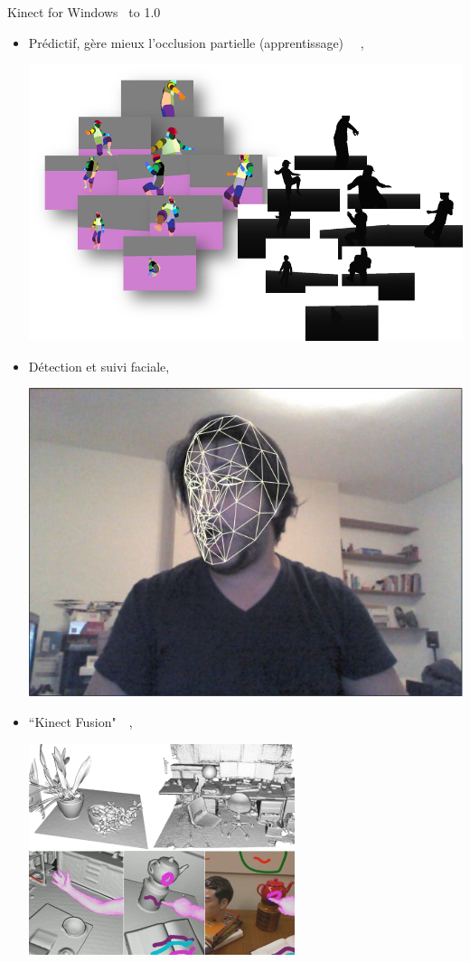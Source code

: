 \begin{frame}{Kinect for Windows~\cite{microsoft_vs_openni_2}}
\vbox to 1.0\textheight
{
\begin{itemize}
  \item<1-> Prédictif, gère mieux l'occlusion partielle (apprentissage)
                ~\cite{how_you_become_the_controller}~\cite{shotton2011},
  {
    \vfill
    \begin{center}
    \includegraphics[width=0.7\linewidth]{../images/kinect_learning}
    \end{center}
  }
  \item<2-> Détection et suivi faciale,
  {
    \vfill
    \begin{center}
    \includegraphics[width=0.5\linewidth]{../images/kinect_face_track}
    \end{center}
  }
  \item<3-> ``Kinect Fusion"~\cite{newcombe2011}~\cite{izadi2011},
  {
    \vfill
    \begin{center}
    \includegraphics[width=0.4\linewidth]{../images/kinect_fusion}
    \end{center}
  }

\end{itemize}
\vfill
}
\end{frame}

